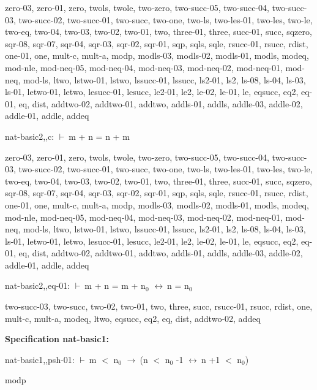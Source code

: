 \documentclass[a4paper]{article}
\newcommand{\Fol}{\mbox{$\vdash\ $}}
\newcommand{\Imp}{\mbox{$\rightarrow\ $}}
\newcommand{\Equiv}{\mbox{$\leftrightarrow\ $}}
\begin{document}
zero-03, zero-01, zero, twols, twole, two-zero, two-succ-05, two-succ-04, two-succ-03, two-succ-02, two-succ-01, two-succ, two-one, two-ls, two-les-01, two-les, two-le, two-eq, two-04, two-03, two-02, two-01, two, three-01, three, succ-01, succ, sqzero, sqr-08, sqr-07, sqr-04, sqr-03, sqr-02, sqr-01, sqp, sqls, sqle, rsucc-01, rsucc, rdist, one-01, one, mult-c, mult-a, modp, modls-03, modls-02, modls-01, modls, modeq, mod-nle, mod-neq-05, mod-neq-04, mod-neq-03, mod-neq-02, mod-neq-01, mod-neq, mod-ls, ltwo, lstwo-01, lstwo, lssucc-01, lssucc, ls2-01, ls2, ls-08, ls-04, ls-03, ls-01, letwo-01, letwo, lesucc-01, lesucc, le2-01, le2, le-02, le-01, le, eqsucc, eq2, eq-01, eq, dist, addtwo-02, addtwo-01, addtwo, addls-01, addls, addle-03, addle-02, addle-01, addle, addeq

\bigskip

nat-basic2,,c: 
 \Fol m + n = n + m



zero-03, zero-01, zero, twols, twole, two-zero, two-succ-05, two-succ-04, two-succ-03, two-succ-02, two-succ-01, two-succ, two-one, two-ls, two-les-01, two-les, two-le, two-eq, two-04, two-03, two-02, two-01, two, three-01, three, succ-01, succ, sqzero, sqr-08, sqr-07, sqr-04, sqr-03, sqr-02, sqr-01, sqp, sqls, sqle, rsucc-01, rsucc, rdist, one-01, one, mult-c, mult-a, modp, modls-03, modls-02, modls-01, modls, modeq, mod-nle, mod-neq-05, mod-neq-04, mod-neq-03, mod-neq-02, mod-neq-01, mod-neq, mod-ls, ltwo, lstwo-01, lstwo, lssucc-01, lssucc, ls2-01, ls2, ls-08, ls-04, ls-03, ls-01, letwo-01, letwo, lesucc-01, lesucc, le2-01, le2, le-02, le-01, le, eqsucc, eq2, eq-01, eq, dist, addtwo-02, addtwo-01, addtwo, addls-01, addls, addle-03, addle-02, addle-01, addle, addeq

\bigskip

nat-basic2,,eq-01: 
 \Fol m + n = m + $\mbox{n}_{0}$ \Equiv n = $\mbox{n}_{0}$



two-succ-03, two-succ, two-02, two-01, two, three, succ, rsucc-01, rsucc, rdist, one, mult-c, mult-a, modeq, ltwo, eqsucc, eq2, eq, dist, addtwo-02, addeq

\bigskip

{\bf Specification nat-basic1:}

nat-basic1,,psh-01: 
 \Fol m $<$ $\mbox{n}_{0}$ \Imp (n $<$ $\mbox{n}_{0}$ -1 \Equiv n +1 $<$ $\mbox{n}_{0}$)



modp

\bigskip
\end{document}
